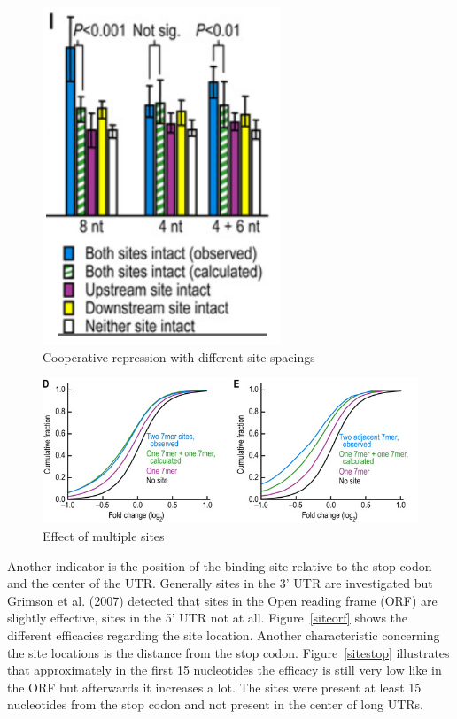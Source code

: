 \documentclass[12pt,  a4paper]{report}
\begin{document}
\begin{figure}[h]
\centering
\includegraphics[scale=0.6]{results/sites_8nt.PNG}  
\caption{Cooperative repression with different site spacings}
\label{sitespacing}
\end{figure}

\begin{figure}[h]
\centering
\includegraphics[scale=0.65]{results/sites_distance.PNG}
\caption{Effect of multiple sites}
\label{sitedistance}
\end{figure}

Another indicator is the position of the binding site relative to the stop codon and the center of the UTR. Generally sites in the 3' UTR are investigated but Grimson et al. (2007) detected that sites in the Open reading frame (ORF) are slightly effective, sites in the 5' UTR not at all. Figure~\ref{siteorf} shows the different efficacies regarding the site location. Another characteristic concerning the site locations is the distance from the stop codon. Figure~\ref{sitestop} illustrates that approximately in the first 15 nucleotides the efficacy is still very low like in the ORF but afterwards it increases a lot. The sites were present at least 15 nucleotides from the stop codon and not present in the center of long UTRs. \\
\end{document}
